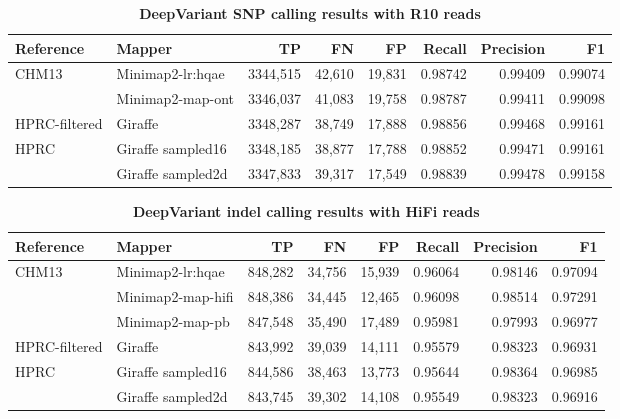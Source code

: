 \documentclass[11pt]{ucscthesis}
\begin{document}
\begin{landscape}
\begin{table}[htb]
    \centering
    \begin{tabular}{|l|l|r|r|r|r|r|r|}
        \hline
        Reference         & Mapper               & TP          & FN          & FP         & Recall      & Precision   & F1 \\
        \hline
        CHM13             & Minimap2-lr:hqae     & 3344,515     & 42,610     & 19,831     & 0.98742     & 0.99409     & 0.99074 \\
                          & Minimap2-map-ont     & 3346,037     & 41,083     & 19,758     & 0.98787     & 0.99411     & 0.99098 \\
        HPRC-filtered     & Giraffe              & 3348,287     & 38,749     & 17,888     & 0.98856     & 0.99468     & 0.99161 \\
        HPRC              & Giraffe sampled16    & 3348,185     & 38,877     & 17,788     & 0.98852     & 0.99471     & 0.99161 \\
                          & Giraffe sampled2d    & 3347,833     & 39,317     & 17,549     & 0.98839     & 0.99478     & 0.99158 \\
        \hline
    \end{tabular}
    \caption[DeepVariant SNP R10 results]{\textbf{DeepVariant SNP calling results with R10 reads}}
    \label{tab:dv_snp_r10}
\end{table}

\begin{table}[htb]
    \centering
    \begin{tabular}{|l|l|r|r|r|r|r|r|}
        \hline
        Reference         & Mapper               & TP          & FN         & FP         & Recall      & Precision   & F1 \\
        \hline
        CHM13             & Minimap2-lr:hqae     & 848,282     & 34,756     & 15,939     & 0.96064     & 0.98146     & 0.97094 \\
                          & Minimap2-map-hifi    & 848,386     & 34,445     & 12,465     & 0.96098     & 0.98514     & 0.97291 \\
                          & Minimap2-map-pb      & 847,548     & 35,490     & 17,489     & 0.95981     & 0.97993     & 0.96977 \\
        HPRC-filtered     & Giraffe              & 843,992     & 39,039     & 14,111     & 0.95579     & 0.98323     & 0.96931 \\
        HPRC              & Giraffe sampled16    & 844,586     & 38,463     & 13,773     & 0.95644     & 0.98364     & 0.96985 \\
                          & Giraffe sampled2d    & 843,745     & 39,302     & 14,108     & 0.95549     & 0.98323     & 0.96916 \\
        \hline
    \end{tabular}
    \caption[DeepVariant indel HiFi results]{\textbf{DeepVariant indel calling results with HiFi reads}}
    \label{tab:dv_indel_hifi}
\end{table}



\end{landscape}
\end{document}

